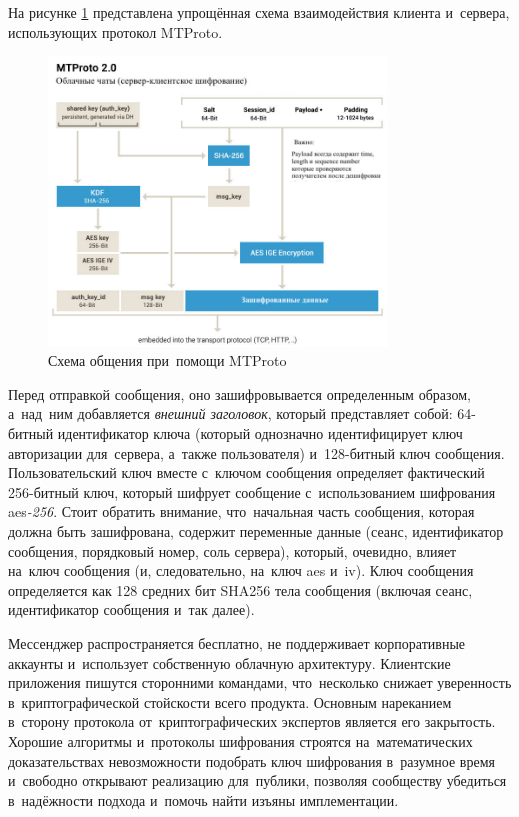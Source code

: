 На рисунке \ref{sec:analysis:research:analogs:telegram:mtproto1} представлена упрощённая схема взаимодействия клиента и~сервера, использующих протокол MTProto.

\begin{figure}[h]
  \centering
    \includegraphics[width=0.8\textwidth]{inc/img/mtproto1.jpeg}
  \caption{Схема общения при~помощи MTProto}
  \label{sec:analysis:research:analogs:telegram:mtproto1}
\end{figure}

Перед отправкой сообщения, оно зашифровывается определенным образом, а~над~ним добавляется \textit{внешний заголовок}, который представляет собой: 64-битный идентификатор ключа (который однозначно идентифицирует ключ авторизации для~сервера, а~также пользователя) и~128-битный ключ сообщения. Пользовательский ключ вместе с~ключом сообщения определяет фактический 256-битный ключ, который шифрует сообщение с~использованием шифрования \gls{aes}\textit{-256}. Стоит обратить внимание, что~начальная часть сообщения, которая должна быть зашифрована, содержит переменные данные (сеанс, идентификатор сообщения, порядковый номер, соль сервера), который, очевидно, влияет на~ключ сообщения (и, следовательно, на~ключ \gls{aes} и~iv). Ключ сообщения определяется как 128 средних бит SHA256 тела сообщения (включая сеанс, идентификатор сообщения и~так далее).

Мессенджер распространяется бесплатно, не поддерживает корпоративные аккаунты и~использует собственную облачную архитектуру. Клиентские приложения пишутся сторонними командами, что~несколько снижает уверенность в~криптографической стойскости всего продукта. Основным нареканием в~сторону протокола от~криптографических экспертов является его закрытость. Хорошие алгоритмы и~протоколы шифрования строятся на~математических доказательствах невозможности подобрать ключ шифрования в~разумное время и~свободно открывают реализацию для~публики, позволяя сообществу убедиться в~надёжности подхода и~помочь найти изъяны имплементации.